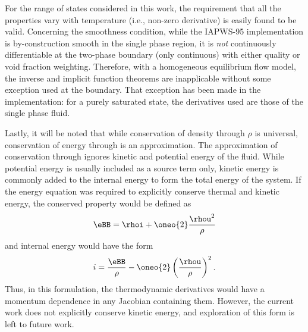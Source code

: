 For the range of states considered in this work, the requirement that all the properties vary with temperature (i.e., non-zero derivative) is easily found to be valid.
Concerning the smoothness condition, while the IAPWS-95 implementation is by-construction smooth in the single phase region, it is \emph{not} continuously differentiable at the two-phase boundary (only continuous) with either quality or void fraction weighting.  
Therefore, with a homogeneous equilibrium flow model, the inverse and implicit function theorems are inapplicable without some exception used at the boundary.
That exception has been made in the implementation: for a purely saturated state, the derivatives used are those of the single phase fluid.

Lastly, it will be noted that while conservation of density through $\rho$ is universal, conservation of energy through \rhoi is an approximation.
The approximation of conservation through \rhoi ignores kinetic and potential energy of the fluid.
While potential energy is usually included as a source term only, kinetic energy is commonly added to the internal energy to form the total energy of the system.
If the energy equation was required to explicitly conserve thermal and kinetic energy, the conserved property would be defined as 
\begin{equation}
    \eBB = \rhoi + \oneo{2} \frac{\rhou^2}{\rho}
\end{equation}
and internal energy would have the form
\begin{equation}
    i = \frac{\eBB}{\rho} - \oneo{2}\left(\frac{\rhou}{\rho}\right)^2.
\end{equation}
Thus, in this formulation, the thermodynamic derivatives would have a momentum dependence in any Jacobian containing them.
However, the current work does not explicitly conserve kinetic energy, and exploration of this form is left to future work.

